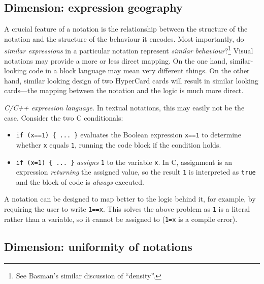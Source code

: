 \documentclass[ twoside,openright,titlepage,numbers=noenddot,headinclude,footinclude,cleardoublepage=empty,abstract=on,
                BCOR=5mm,paper=a4,fontsize=11pt
                ]{scrreprt}
\providecommand{\tightlist}{}\newenvironment{longtable}[2]{\begin{tabular}}{\end{tabular}}
\theoremstyle{definition}
\begin{document}
\hypertarget{dimension-expression-geography}{\subsection{Dimension: expression
geography}\label{dimension-expression-geography}}

A crucial feature of a notation is the relationship between the
structure of the notation and the structure of the behaviour it encodes.
Most importantly, do \emph{similar expressions} in a particular notation
represent \emph{similar behaviour}?\footnote{See Basman's
  \parencite{NotYetCraft} similar discussion of ``density''.} Visual
notations may provide a more or less direct mapping. On the one hand,
similar-looking code in a block language may mean very different things.
On the other hand, similar looking design of two HyperCard cards will
result in similar looking cards---the mapping between the notation and
the logic is much more direct.

\emph{C/C++ expression language.} In textual notations, this may easily
not be the case. Consider the two C conditionals:

\begin{itemize}
\tightlist
\item
  \texttt{if\ (x==1)\ \{\ ...\ \}} evaluates the Boolean expression
  \texttt{x==1} to determine whether \texttt{x} equals \texttt{1},
  running the code block if the condition holds.
\item
  \texttt{if\ (x=1)\ \{\ ...\ \}} \emph{assigns} \texttt{1} to the
  variable \texttt{x}. In C, assignment is an expression
  \emph{returning} the assigned value, so the result \texttt{1} is
  interpreted as \texttt{true} and the block of code is \emph{always}
  executed.
\end{itemize}

A notation can be designed to map better to the logic behind it, for
example, by requiring the user to write \texttt{1==x}. This solves the
above problem as \texttt{1} is a literal rather than a variable, so it
cannot be assigned to (\texttt{1=x} is a compile error).

\hypertarget{dimension-uniformity-of-notations}{\subsection{Dimension: uniformity of
notations}\label{dimension-uniformity-of-notations}}
\end{document}
